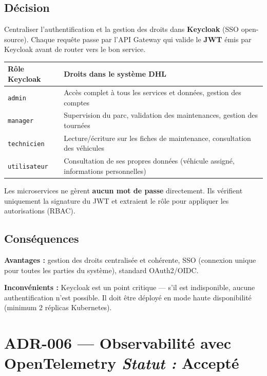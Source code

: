 \documentclass[10pt,a4paper]{article}
\newcommand{\adrstatus}[1]{\hfill{\small\color{muted}\textit{Statut :} \textbf{#1}}}
\begin{document}
\subsection{Décision}
Centraliser l'authentification et la gestion des droits dans \textbf{Keycloak} (SSO open-source). Chaque requête passe par l'API Gateway qui valide le \textbf{JWT} émis par Keycloak avant de router vers le bon service.

\vspace{4pt}
\begin{tabularx}{\linewidth}{lX}
  \toprule
  \small\textbf{Rôle Keycloak} & \small\textbf{Droits dans le système DHL} \\
  \midrule
  \texttt{admin}       & Accès complet à tous les services et données, gestion des comptes \\
  \texttt{manager}     & Supervision du parc, validation des maintenances, gestion des tournées \\
  \texttt{technicien}  & Lecture/écriture sur les fiches de maintenance, consultation des véhicules \\
  \texttt{utilisateur} & Consultation de ses propres données (véhicule assigné, informations personnelles) \\
  \bottomrule
\end{tabularx}

\vspace{4pt}
Les microservices ne gèrent \textbf{aucun mot de passe} directement. Ils vérifient uniquement la signature du JWT et extraient le rôle pour appliquer les autorisations (RBAC).

\subsection{Conséquences}
\textbf{Avantages :} gestion des droits centralisée et cohérente, SSO (connexion unique pour toutes les parties du système), standard OAuth2/OIDC.

\noindent\textbf{Inconvénients :} Keycloak est un point critique --- s'il est indisponible, aucune authentification n'est possible. Il doit être déployé en mode haute disponibilité (minimum 2 réplicas Kubernetes).

\section{ADR-006 --- Observabilité avec OpenTelemetry \adrstatus{Accepté}}
\end{document}
